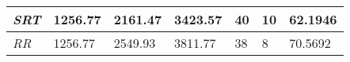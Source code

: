 \documentclass{article}
\begin{document}
\begin{table}[]
\begin{tabular}{|l|l|l|l|l|l|l|}
  \textit{SRT}       & 1256.77                                                                          & 2161.47                                                                     & 3423.57                                                                            & 40                                                                                    & 10                                                                                  & 62.1946                                                                    \\ \hline
  \textit{RR}        & 1256.77                                                                          & 2549.93                                                                     & 3811.77                                                                            & 38                                                                                    & 8                                                                                   & 70.5692                                                                    \\ \hline
  \end{tabular}
  \label{table:12}
\end{table}
\end{document}
